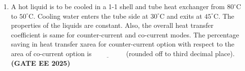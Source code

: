 \documentclass[journal,12pt,onecolumn]{IEEEtran}
\theoremstyle{remark}
\begin{document}
\begin{enumerate}
\item A hot liquid is to be cooled in a 1-1 shell and tube heat exchanger from $80^{\circ}\text{C}$ to $50^{\circ}\text{C}$. Cooling water enters the tube side at $30^{\circ}\text{C}$ and exits at $45^{\circ}\text{C}$. The properties of the liquids are constant. Also, the overall heat transfer coefficient is same for counter-current and co-current modes. The percentage saving in heat transfer xarea for counter-current option with respect to the area of co-current option is$\underline{\hspace{2cm}}$ (rounded off to third decimal place).  \hfill \textbf{(GATE EE 2025)} 


\end{enumerate}
\end{document}
